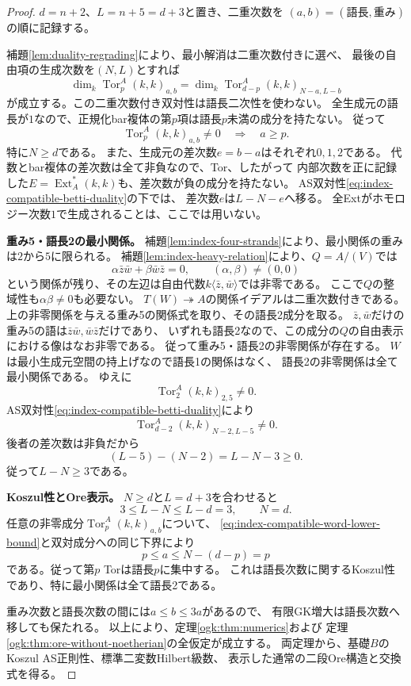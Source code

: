 \documentclass[11pt,a4paper]{ltjsarticle}
\theoremstyle{definition}
\begin{document}
\begin{proof}
$d=n+2$、$L=n+5=d+3$と置き、二重次数を
$(a,b)=(\text{語長},\text{重み})$の順に記録する。

補題\ref{lem:duality-regrading}により、最小解消は二重次数付きに選べ、
最後の自由項の生成次数を$(N,L)$とすれば
\begin{equation}\label{eq:index-compatible-betti-duality}
 \dim_k\operatorname{Tor}^A_p(k,k)_{a,b}
 =\dim_k\operatorname{Tor}^A_{d-p}(k,k)_{N-a,L-b}
\end{equation}
が成立する。この二重次数付き双対性は語長二次性を使わない。
全生成元の語長が$1$なので、正規化bar複体の第$p$項は語長$p$未満の成分を持たない。
従って
\begin{equation}\label{eq:index-compatible-word-lower-bound}
 \operatorname{Tor}^A_p(k,k)_{a,b}\ne0\quad\Longrightarrow\quad a\geq p.
\end{equation}
特に$N\geq d$である。
また、生成元の差次数$e=b-a$はそれぞれ$0,1,2$である。
代数とbar複体の差次数は全て非負なので、Tor、したがって
内部次数を正に記録した$E=\operatorname{Ext}_A^*(k,k)$も、差次数が負の成分を持たない。
AS双対性\eqref{eq:index-compatible-betti-duality}の下では、
差次数$e$は$L-N-e$へ移る。
全Extがホモロジー次数$1$で生成されることは、ここでは用いない。

\par\smallskip\noindent\textbf{重み5・語長2の最小関係。}\quad
補題\ref{lem:index-four-strands}により、最小関係の重みは$2$から$5$に限られる。
補題\ref{lem:index-heavy-relation}により、$Q=A/(V)$では
\[
 \alpha\bar z\bar w+\beta\bar w\bar z=0,
 \qquad(\alpha,\beta)\ne(0,0)
\]
という関係が残り、その左辺は自由代数$k\langle\bar z,\bar w\rangle$では非零である。
ここで$Q$の整域性も$\alpha\beta\ne0$も必要ない。
$T(W)\twoheadrightarrow A$の関係イデアルは二重次数付きである。
上の非零関係を与える重み5の関係式を取り、その語長2成分を取る。
$\bar z,\bar w$だけの重み5の語は$\bar z\bar w,\bar w\bar z$だけであり、
いずれも語長2なので、この成分の$Q$の自由表示における像はなお非零である。
従って重み5・語長2の非零関係が存在する。
$W$は最小生成元空間の持上げなので語長1の関係はなく、
語長2の非零関係は全て最小関係である。
ゆえに
\[
 \operatorname{Tor}^A_2(k,k)_{2,5}\ne0.
\]
AS双対性\eqref{eq:index-compatible-betti-duality}により
\[
 \operatorname{Tor}^A_{d-2}(k,k)_{N-2,L-5}\ne0.
\]
後者の差次数は非負だから
\[
 (L-5)-(N-2)=L-N-3\geq0.
\]
従って$L-N\geq3$である。

\par\smallskip\noindent\textbf{Koszul性とOre表示。}\quad
$N\geq d$と$L=d+3$を合わせると
\[
 3\leq L-N\leq L-d=3,
 \qquad N=d.
\]
任意の非零成分$\operatorname{Tor}^A_p(k,k)_{a,b}$について、
\eqref{eq:index-compatible-word-lower-bound}と双対成分への同じ下界により
\[
 p\leq a\leq N-(d-p)=p
\]
である。従って第$p$ Torは語長$p$に集中する。
これは語長次数に関するKoszul性であり、特に最小関係は全て語長2である。

重み次数と語長次数の間には$a\leq b\leq3a$があるので、
有限GK増大は語長次数へ移しても保たれる。
以上により、定理\ref{ogk:thm:numerics}および
定理\ref{ogk:thm:ore-without-noetherian}の全仮定が成立する。
両定理から、基礎$B$のKoszul AS正則性、標準二変数Hilbert級数、
表示した通常の二段Ore構造と交換式を得る。
\end{proof}
\end{document}
